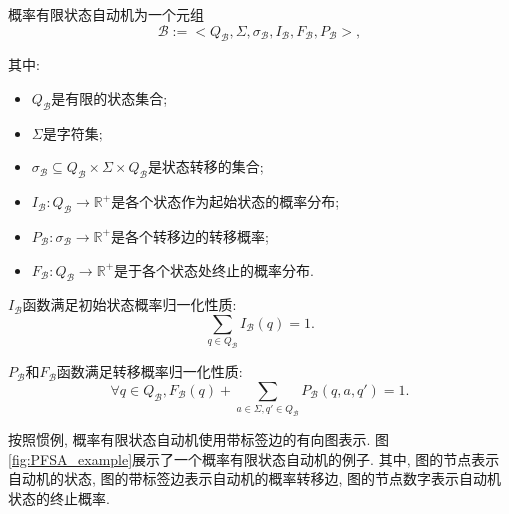             \begin{definition}
                \label{def.pfsa}
                概率有限状态自动机为一个元组
                \begin{equation}
                    \mathcal{B} := <Q_{\mathcal{B}}, \Sigma, \sigma_{\mathcal{B}}, I_{\mathcal{B}}, F_{\mathcal{B}}, P_{\mathcal{B}}>,
                \end{equation}
                
                其中:
                \begin{itemize}
                    \item $Q_{\mathcal{B}}$是有限的状态集合;
                    \item $\Sigma$是字符集;
                    \item $\sigma_{\mathcal{B}} \subseteq Q_{\mathcal{B}} \times \Sigma \times Q_{\mathcal{B}}$是状态转移的集合;
                    \item $I_{\mathcal{B}} : Q_{\mathcal{B}} \to \mathbb{R}^{+}$是各个状态作为起始状态的概率分布;
                    \item $P_{\mathcal{B}} : \sigma_{\mathcal{B}} \to \mathbb{R}^{+}$是各个转移边的转移概率;
                    \item $F_{\mathcal{B}}: Q_{\mathcal{B}} \to \mathbb{R}^{+}$是于各个状态处终止的概率分布.
                \end{itemize}
                
                $I_{\mathcal{B}}$函数满足初始状态概率归一化性质:
                \begin{equation}
                    \sum_{q \in Q_{\mathcal{B}}} I_{\mathcal{B}}(q) = 1.
                \end{equation}
                
                $P_{\mathcal{B}}$和$F_{\mathcal{B}}$函数满足转移概率归一化性质:
                \begin{equation}
                    \forall q \in Q_{\mathcal{B}}, F_{\mathcal{B}}(q) + \sum_{a \in \Sigma, q' \in Q_{\mathcal{B}}} P_{\mathcal{B}}(q,a,q') = 1.
                \end{equation}
            \end{definition}
            
            按照惯例, 概率有限状态自动机使用带标签边的有向图表示. 图\ref{fig:PFSA_example}展示了一个概率有限状态自动机的例子. 其中, 图的节点表示自动机的状态, 图的带标签边表示自动机的概率转移边, 图的节点数字表示自动机状态的终止概率.
            
